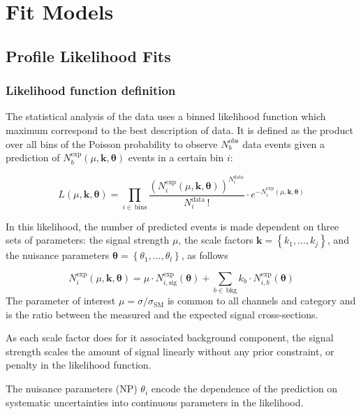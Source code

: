 \chapter{Fit Models}
\label{ch:fit-models}
\section{Profile Likelihood Fits}%
\label{sec:plf}
\subsection{Likelihood function definition}
\label{sec:lhoodDef}
The statistical analysis of the data uses a binned likelihood function which
maximum correspond to the best description of data. It is defined as the product
over all bins of the Poisson probability to observe $N^{\text{obs}}_b$ data
events given a prediction of
$N^{\text{exp}}_b(\mu,\mathbf{k},{\bm\theta})$ events in a certain bin
$i$:

\begin{equation}
  L(\mu,{\bm{k},\bm{\theta}}) =
  \prod_{i\in\,\text{bins}} \frac{\left( N_{i}^{\text{exp}}(\mu,{\bm{k,\theta}}) \right)^{N_{i}^{\text{data}}}}{N_{i}^{\text{data}}\,!}
  \cdot e^{-N_{i}^{\text{exp}}(\mu,{\bm{k,\theta}})}
\end{equation}

In this likelihood, the number of predicted events is made dependent on three
sets of parameters: the signal strength $\mu$, the scale factors
$\mathbf{k}=\left\{k_1, ...,k_j\right\}$, and the nuisance parameters
$\bm{\theta} = \left\{\theta_1,...,\theta_l\right\}$, as follows

\begin{equation}
  N_{i}^{\text{exp}}(\mu,\mathbf{k},\bm{\theta}) = \mu \cdot N_{i,\text{sig}}^{\text{exp}}(\bm{\theta}) + \sum_{b\in\,\text{bkg}} k_b\cdot N_{i,b}^{\text{exp}}(\bm{\theta})
\end{equation}
The parameter of interest $\mu=\sigma/\sigma_{\text{SM}}$ is common to all
channels and category and is the ratio between the measured and the expected
signal cross-sections.

As each scale factor does for it associated background component, the signal
strength scales the amount of signal linearly without any prior constraint, or
penalty in the likelihood function.


The nuisance parameters (NP) $\theta_i$ encode the dependence of the prediction
on systematic uncertainties into continuous parameters in the likelihood.

